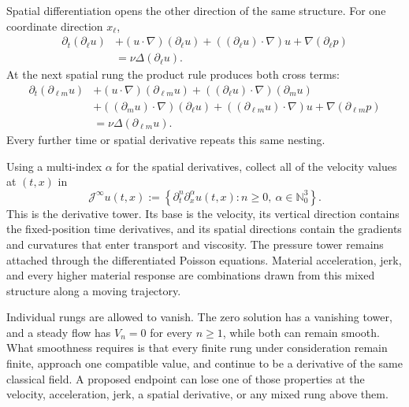 Spatial differentiation opens the other direction of the same structure.
For one coordinate direction \(x_\ell\),
\[
  \begin{aligned}
  \partial_t(\partial_\ell u)
  &+
  (u\cdot\nabla)(\partial_\ell u)
  +
  ((\partial_\ell u)\cdot\nabla)u
  +
  \nabla(\partial_\ell p)\\
  &=
  \nu\Delta(\partial_\ell u).
  \end{aligned}
\]
At the next spatial rung the product rule produces both cross terms:
\[
  \begin{aligned}
  \partial_t(\partial_{\ell m}u)
  &+
  (u\cdot\nabla)(\partial_{\ell m}u)
  +
  ((\partial_\ell u)\cdot\nabla)(\partial_m u)\\
  &+
  ((\partial_m u)\cdot\nabla)(\partial_\ell u)
  +
  ((\partial_{\ell m}u)\cdot\nabla)u
  +
  \nabla(\partial_{\ell m}p)\\
  &=
  \nu\Delta(\partial_{\ell m}u).
  \end{aligned}
\]
Every further time or spatial derivative repeats this same nesting.

Using a multi-index \(\alpha\) for the spatial derivatives, collect all of the velocity values at \((t,x)\) in
\[
  \mathcal J^\infty u(t,x)
  :=
  \left\{
    \partial_t^n\partial_x^\alpha u(t,x):
    n\geq0,\ 
    \alpha\in\mathbb N_0^3
  \right\}.
\]
This is the derivative tower.
Its base is the velocity, its vertical direction contains the fixed-position time derivatives, and its spatial directions contain the gradients and curvatures that enter transport and viscosity.
The pressure tower remains attached through the differentiated Poisson equations.
Material acceleration, jerk, and every higher material response are combinations drawn from this mixed structure along a moving trajectory.

Individual rungs are allowed to vanish.
The zero solution has a vanishing tower, and a steady flow has \(V_n=0\) for every \(n\geq1\), while both can remain smooth.
What smoothness requires is that every finite rung under consideration remain finite, approach one compatible value, and continue to be a derivative of the same classical field.
A proposed endpoint can lose one of those properties at the velocity, acceleration, jerk, a spatial derivative, or any mixed rung above them.
